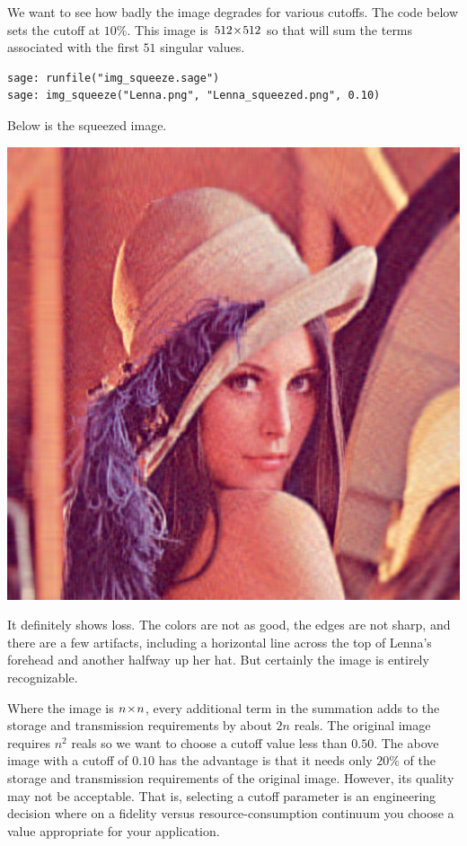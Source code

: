 We want to see how badly the image degrades for various cutoffs.
The code below sets the cutoff at $10$\%.
This image is $512 \! \times \! 512$ so that will sum the terms associated
with the first $51$ singular 
values.
\begin{lstlisting}
sage: runfile("img_squeeze.sage")                                 
sage: img_squeeze("Lenna.png", "Lenna_squeezed.png", 0.10)
\end{lstlisting}
Below is the squeezed image.
\begin{center}
  \includegraphics[width=.95\textwidth]{Lenna_squeezed.png}
\end{center}
It definitely shows loss.
The colors are not as good, the edges are not sharp, and there are 
a few artifacts, including a horizontal line across the top of 
Lenna's forehead and another halfway up her hat.
But certainly the image is entirely recognizable.

Where the image is $n \! \times \! n$, every additional term in the summation
adds to the storage and transmission requirements by about $2n$ reals.
The original image requires $n^2$ reals so we want to choose a cutoff value 
less than $0.50$.
The above image with a cutoff of $0.10$ has the advantage is that it needs 
only $20\%$ of the storage
and transmission requirements of the original image.
However, its quality may not be acceptable.
That is, selecting a cutoff parameter is an engineering decision where
on a fidelity versus resource-consumption continuum 
you choose a value appropriate for your application.
 
